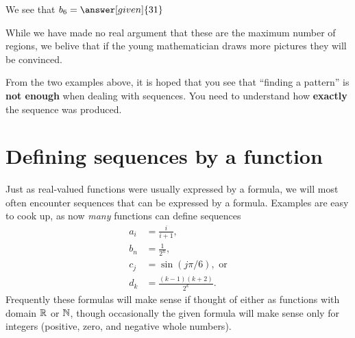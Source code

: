 \documentclass{ximera}
\begin{document}
\begin{example}
\begin{explanation}
\begin{itemize}
 We see that $b_6 = \answer[given]{31}$
    \end{itemize}
    While we have made no real argument that these are the maximum
    number of regions, we belive that if the young mathematician draws
    more pictures they will be convinced.
  \end{explanation}
\end{example}


From the two examples above, it is hoped that you see that ``finding a
pattern'' is \textbf{not enough} when dealing with sequences. You need
to understand how \textbf{exactly} the sequence was produced.




\section{Defining sequences by a function}

Just as real-valued functions were usually expressed by a formula, we
will most often encounter sequences that can be expressed by a
formula.  Examples are easy to cook up, as now \textit{many} functions
can define sequences
\begin{align*}
  a_i &=\frac{i}{i+1}, \\
  b_n &=\frac{1}{2^n}, \\
  c_j &=\sin(j\pi/6), \text{ or} \\
  d_k &=\frac{(k-1)(k+2)}{2^k}. 
\end{align*}
Frequently these formulas will make sense if thought of either as
functions with domain $\mathbb R$ or $\mathbb N$, though occasionally the given
formula will make sense only for integers (positive, zero, and
negative whole numbers).
\end{document}
